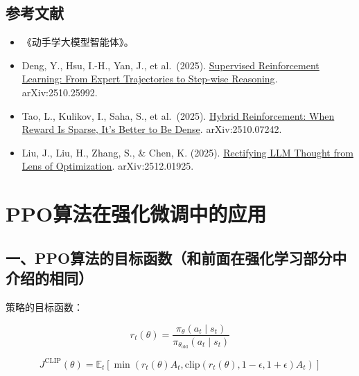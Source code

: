\hypertarget{ux53c2ux8003ux6587ux732e-81}{%
\subsection{参考文献}\label{ux53c2ux8003ux6587ux732e-81}}

\begin{itemize}
\tightlist
\item
  《动手学大模型智能体》。
\item
  Deng, Y., Hsu, I.-H., Yan, J., et al.~(2025). \href{https://arxiv.org/abs/2510.25992}{Supervised Reinforcement Learning: From Expert Trajectories to Step-wise Reasoning}. arXiv:2510.25992.
\item
  Tao, L., Kulikov, I., Saha, S., et al.~(2025). \href{https://arxiv.org/abs/2510.07242}{Hybrid Reinforcement: When Reward Is Sparse, It's Better to Be Dense}. arXiv:2510.07242.
\item
  Liu, J., Liu, H., Zhang, S., \& Chen, K. (2025). \href{https://arxiv.org/abs/2512.01925}{Rectifying LLM Thought from Lens of Optimization}. arXiv:2512.01925.
\end{itemize}

\clearpage

\hypertarget{ppoux7b97ux6cd5ux5728ux5f3aux5316ux5faeux8c03ux4e2dux7684ux5e94ux7528}{%
\section{PPO算法在强化微调中的应用}\label{ppoux7b97ux6cd5ux5728ux5f3aux5316ux5faeux8c03ux4e2dux7684ux5e94ux7528}}

\hypertarget{ux4e00ppoux7b97ux6cd5ux7684ux76eeux6807ux51fdux6570ux548cux524dux9762ux5728ux5f3aux5316ux5b66ux4e60ux90e8ux5206ux4e2dux4ecbux7ecdux7684ux76f8ux540c}{%
\subsection{一、PPO算法的目标函数（和前面在强化学习部分中介绍的相同）}\label{ux4e00ppoux7b97ux6cd5ux7684ux76eeux6807ux51fdux6570ux548cux524dux9762ux5728ux5f3aux5316ux5b66ux4e60ux90e8ux5206ux4e2dux4ecbux7ecdux7684ux76f8ux540c}}

策略的目标函数：

\[
r_t(\theta)=\frac{\pi_\theta(a_t \mid s_t)}{\pi_{\theta_{\mathrm{old}}}(a_t \mid s_t)}
\]

\[
J^{\mathrm{CLIP}}(\theta)
=
\mathbb{E}_t\left[
\min\left(
r_t(\theta)A_t,
\mathrm{clip}(r_t(\theta), 1-\epsilon, 1+\epsilon)A_t
\right)
\right]
\]

